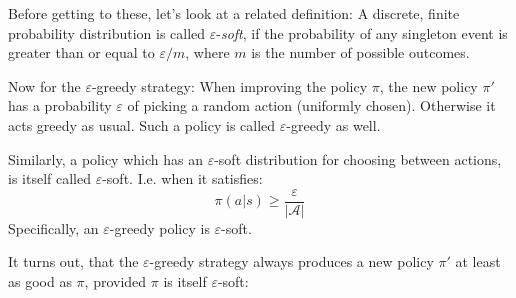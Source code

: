 \documentclass[12pt, a4paper]{article}
\numberwithin{equation}{section}
\begin{document}
Before getting to these, let's look at a related definition: A discrete, finite probability distribution is called $\varepsilon$-\textit{soft}, if the probability of any singleton event is greater than or equal to $\varepsilon/m$, where $m$ is the number of possible outcomes.

Now for the $\varepsilon$-greedy strategy: When improving the policy $\pi$, the new policy $\pi'$ has a probability $\varepsilon$ of picking a random action (uniformly chosen). Otherwise it acts greedy as usual. Such a policy is called $\varepsilon$-greedy as well.

Similarly, a policy which has an $\varepsilon$-soft distribution for choosing between actions, is itself called $\varepsilon$-soft. I.e. when it satisfies:
\begin{equation}
\pi(a|s)\ge\frac{\varepsilon}{|\mathcal{A}|}
\end{equation}
Specifically, an $\varepsilon$-greedy policy is $\varepsilon$-soft.

It turns out, that the $\varepsilon$-greedy strategy always produces a new policy $\pi'$ at least as good as $\pi$, provided $\pi$ is itself $\varepsilon$-soft:
\end{document}
